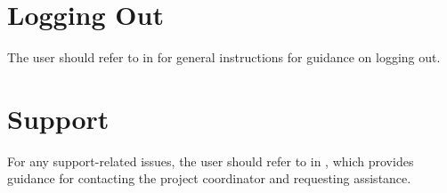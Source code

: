 


\chapter{Logging Out} \label{chap:admin-logout}

The \admin user should refer to  in \userpart for general instructions for guidance on logging out.
 


\chapter{Support} \label{chap:admin-support}

For any support-related issues, the \admin user should refer to  in \userpart, which provides guidance for contacting the project coordinator and requesting assistance.

